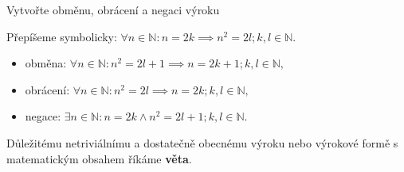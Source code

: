 \begin{priklad}
    Vytvořte obměnu, obrácení a negaci výroku
    \begin{center}
    \end{center}
\end{priklad}

\begin{reseni}
Přepíšeme symbolicky: $\forall n \in \mathbb N: n=2k \implies n^2=2l; k,l \in \mathbb N.$
\begin{itemize}
\item obměna: $\forall n \in \mathbb N: n^2=2l+1 \implies n=2k+1; k,l \in \mathbb N,$
\item obrácení: $\forall n \in \mathbb N: n^2=2l \implies n=2k; k,l \in \mathbb N,$
\item negace: $\exists n \in \mathbb N: n=2k\land n^2 = 2l+1; k,l\in \mathbb N.$
\end{itemize}
\end{reseni}

\begin{pozn}
  Důležitému netriviálnímu a dostatečně obecnému výroku nebo výrokové formě s matematickým obsahem říkáme \textbf{věta}.
\end{pozn}


